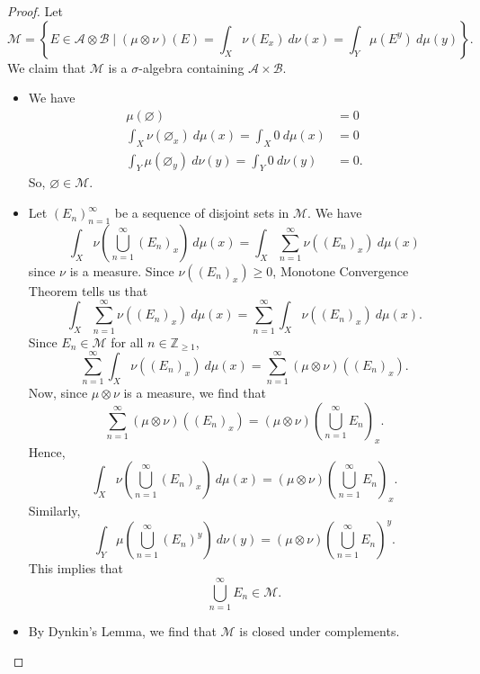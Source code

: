 \documentclass[a4paper, openany]{memoir}
\theoremstyle{definition}
\theoremstyle{plain}
\begin{document}
    \begin{proof}
        Let
        \[\mathcal{M} = \left\{E \in \mathcal{A} \otimes \mathcal{B} \mid (\mu \otimes \nu)(E) = \int_X \nu(E_x) \ d\nu(x) = \int_Y \mu(E^y) \ d\mu(y)\right\}.\]
        We claim that $\mathcal{M}$ is a $\sigma$-algebra containing $\mathcal{A} \times \mathcal{B}$.
        \begin{itemize}
            \item We have
            \begin{align*}
                \mu(\varnothing) &= 0 \\
                \int_X \nu(\varnothing_x) \ d\mu(x) = \int_X 0 \ d\mu(x) &= 0 \\
                \int_Y \mu(\varnothing_y) \ d\nu(y) = \int_Y 0 \ d\nu(y) &= 0.
            \end{align*}
            So, $\varnothing \in \mathcal{M}$.

            \item Let $(E_n)_{n=1}^\infty$ be a sequence of disjoint sets in $\mathcal{M}$. We have
            \[\int_X \nu \left(\bigcup_{n=1}^\infty (E_n)_x\right) \ d\mu(x) = \int_X \sum_{n=1}^\infty \nu((E_n)_x) \ d\mu(x)\]
            since $\nu$ is a measure. Since $\nu((E_n)_x) \geq 0$, Monotone Convergence Theorem tells us that
            \[\int_X \sum_{n=1}^\infty \nu((E_n)_x) \ d\mu(x) = \sum_{n=1}^\infty \int_X \nu((E_n)_x) \ d\mu(x).\]
            Since $E_n \in \mathcal{M}$ for all $n \in \mathbb{Z}_{\geq 1}$,
            \[\sum_{n=1}^\infty \int_X \nu ((E_n)_x) \ d\mu(x) = \sum_{n=1}^\infty (\mu \otimes \nu)((E_n)_x).\]
            Now, since $\mu \otimes \nu$ is a measure, we find that
            \[\sum_{n=1}^\infty (\mu \otimes \nu) ((E_n)_x) = (\mu \otimes \nu) (\bigcup_{n=1}^\infty E_n)_x.\]
            Hence,
            \[\int_X \nu \left(\bigcup_{n=1}^\infty (E_n)_x\right) \ d\mu(x) = (\mu \otimes \nu) (\bigcup_{n=1}^\infty E_n)_x.\]
            Similarly,
            \[\int_Y \mu \left(\bigcup_{n=1}^\infty (E_n)^y \right) \ d\nu(y) = (\mu \otimes \nu) (\bigcup_{n=1}^\infty E_n)^y.\]
            This implies that
            \[\bigcup_{n=1}^\infty E_n \in \mathcal{M}.\]
            
            \item By Dynkin's Lemma, we find that $\mathcal{M}$ is closed under complements.
            

\end{itemize}
\end{proof}
\end{document}
